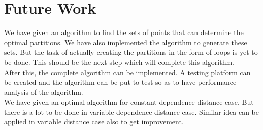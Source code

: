 \chapter{Future Work}
We have given an algorithm to find the sets of points that can determine the optimal partitions. We have also implemented the algorithm to generate these sets. But the task of actually creating the partitions in the form of loops is yet to be done. This should be the next step which will complete this algorithm. \\

After this, the complete algorithm can be implemented. A testing platform can be created and the algorithm can be put to test so as to have performance analysis of the algorithm. \\

We have given an optimal algorithm for constant dependence distance case. But there is a lot to be done in variable dependence distance case. Similar idea can be applied in variable distance case also to get improvement. \\